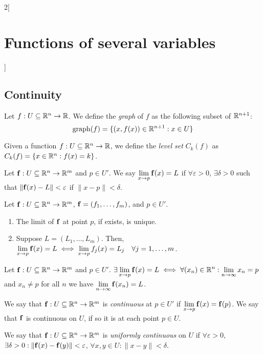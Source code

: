 \documentclass[../../../main.tex]{subfiles}
\begin{document}
\begin{multicols}{2}[\section{Functions of several variables}]
  \subsection{Continuity}
  \begin{definition}
    Let $f:U\subseteq\mathbb{R}^n\rightarrow\mathbb{R} $. We define the \emph{graph} of $f$ as the following subset of $\mathbb{R}^{n+1}$: $$\operatorname{graph}(f)=\{(x,f(x))\in\mathbb{R}^{n+1}:x\in U\}$$
  \end{definition}
  \begin{definition}
    Given a function $f:U\subseteq\mathbb{R}^n\rightarrow\mathbb{R} $, we define the \emph{level set} $C_k(f)$ as $C_k(f)=\{x\in\mathbb{R}^n:f(x)=k\}$.
  \end{definition}
  \begin{definition}
    Let $\boldsymbol{\mathrm{f}}:U\subseteq\mathbb{R}^n\rightarrow\mathbb{R}^m$ and $p\in U'$. We say $\displaystyle\lim_{x\to p}\boldsymbol{\mathrm{f}}(x)=L$ if $\forall\varepsilon>0$, $\exists\delta>0$ such that $\|\boldsymbol{\mathrm{f}}(x)-L\|<\varepsilon$ if $\|x-p\|<\delta$.
  \end{definition}
  \begin{proposition}
    Let $\boldsymbol{\mathrm{f}}:U\subseteq\mathbb{R}^n\rightarrow\mathbb{R}^m$, $\boldsymbol{\mathrm{f}}=(f_1,\ldots,f_m)$, and $p\in U'$.
    \begin{enumerate}
      \item The limit of $\boldsymbol{\mathrm{f}}$ at point $p$, if exists, is unique.
      \item Suppose $L=(L_1,\ldots,L_m)$. Then, $\displaystyle\lim_{x\to p}\boldsymbol{\mathrm{f}}(x)=L\iff\lim_{x\to p}f_j(x)=L_j\quad\forall j=1,\ldots,m$.
    \end{enumerate}
  \end{proposition}
  \begin{lemma}
    Let $\boldsymbol{\mathrm{f}}:U\subseteq\mathbb{R}^n\rightarrow\mathbb{R}^m$ and $p\in U'$. $\displaystyle\exists\lim_{x\to p}\boldsymbol{\mathrm{f}}(x)=L\iff\forall(x_n)\in\mathbb{R}^n:\lim_{n\to\infty}x_n=p$ and $x_n\ne p$ for all $n$ we have $\displaystyle\lim_{n\to \infty}\boldsymbol{\mathrm{f}}(x_n)=L$.
  \end{lemma}
  \begin{definition}
    We say that $\boldsymbol{\mathrm{f}}:U\subseteq\mathbb{R}^n\rightarrow\mathbb{R}^m$ is \emph{continuous} at $p\in U'$ if $\displaystyle\lim_{x\to p}\boldsymbol{\mathrm{f}}(x)=\boldsymbol{\mathrm{f}}(p)$. We say that $\boldsymbol{\mathrm{f}}$ is continuous on $U$, if so it is at each point $p\in U$.
  \end{definition}
  \begin{definition}
    We say that $\boldsymbol{\mathrm{f}}:U\subseteq\mathbb{R}^n\rightarrow\mathbb{R}^m$ is \emph{uniformly continuous} on $U$ if $\forall\varepsilon>0$, $\exists\delta>0:\|\boldsymbol{\mathrm{f}}(x)-\boldsymbol{\mathrm{f}}(y)\|<\varepsilon$, $\forall x,y\in U:\|x-y\|<\delta$.

\end{definition}
\end{multicols}
\end{document}
